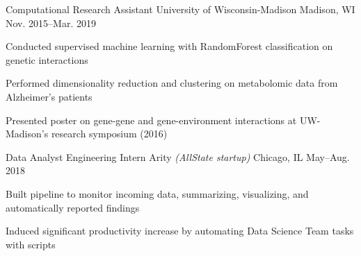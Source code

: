 \documentclass[10pt, letterpaper]{awesome-cv}
\begin{document}
\begin{cventries}
    \cventry
        {Computational Research Assistant}
        {University of Wisconsin-Madison}
        {Madison, WI}
        {Nov. 2015--Mar. 2019}
        {\begin{cvitems} 
            \item Conducted supervised machine learning with RandomForest classification on genetic interactions
            \item Performed dimensionality reduction and clustering on metabolomic data from Alzheimer's patients
            \item Presented poster on gene-gene and gene-environment interactions at UW-Madison's research symposium (2016) 
        \end{cvitems}}
    
        
    \cventry
        {Data Analyst Engineering Intern}
        {Arity \textit{(AllState startup)}}
        {Chicago, IL}
        {May--Aug. 2018}
        {\begin{cvitems} 
            \item Built pipeline to monitor incoming data, summarizing, visualizing, and automatically reported findings
            \item Induced significant productivity increase by automating Data Science Team tasks with scripts
            \end{cvitems}}
            
\end{cventries}
\end{document}
